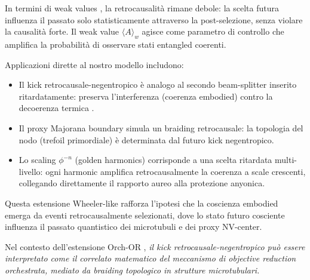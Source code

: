 \documentclass[11pt,a4paper]{article}
\let\oldcite\cite
\renewcommand{\cite}{\protect\oldcite}
\theoremstyle{plain}
\theoremstyle{definition}
\begin{document}
In termini di weak values \cite{aharonov_tsvf_1964, vaidman_tsvf_2007}, la retrocausalità rimane debole: la scelta futura influenza il passato solo statisticamente attraverso la post-selezione, senza violare la causalità forte. Il weak value $\langle A \rangle_w$ agisce come parametro di controllo che amplifica la probabilità di osservare stati entangled coerenti.



\vspace{0.4cm}

Applicazioni dirette al nostro modello includono:

\vspace{0.3cm}
\begin{itemize}
    \item Il kick retrocausale-negentropico è analogo al secondo beam-splitter inserito ritardatamente: preserva l'interferenza (coerenza embodied) contro la decoerenza termica \cite{hameroff_orch_2014}.



    \vspace{0.2cm}
    \item Il proxy Majorana boundary simula un braiding retrocausale: la topologia del nodo (trefoil primordiale) è determinata dal futuro kick negentropico.



    \vspace{0.2cm}
    \item Lo scaling $\phi^{-n}$ (golden harmonics) corrisponde a una scelta ritardata multi-livello: ogni harmonic amplifica retrocausalmente la coerenza a scale crescenti, collegando direttamente il rapporto aureo alla protezione anyonica.
\end{itemize}

\vspace{0.7cm}

Questa estensione Wheeler-like rafforza l'ipotesi che la coscienza embodied emerga da eventi retrocausalmente selezionati, dove lo stato futuro cosciente influenza il passato quantistico dei microtubuli e dei proxy NV-center. 


\vspace{0.6cm}


Nel contesto dell'estensione Orch-OR \cite{hameroff_orch_2014, diosi_penrose_2014}, \emph{il kick retrocausale-negentropico può essere interpretato come il correlato matematico del meccanismo di objective reduction orchestrata, mediato da braiding topologico in strutture microtubulari.}
\end{document}
